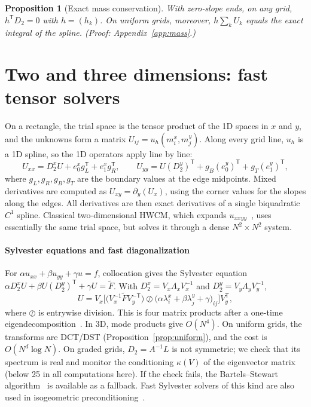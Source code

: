 \documentclass[preprint,12pt]{elsarticle}
\newtheorem{proposition}[theorem]{Proposition}
\theoremstyle{remark}
\newcommand{\proofin}[1]{\hfill{\small\emph{(Proof: Appendix~\ref{#1}.)}}}
\begin{document}
\begin{proposition}[Exact mass conservation]\label{prop:mass}
With zero-slope ends, on any grid, $h^{\mathsf T}D_2=0$ with $h=(h_k)$. On uniform grids,
moreover, $h\sum_kU_k$ equals the exact integral of the spline.
\proofin{app:mass}
\end{proposition}

\section{Two and three dimensions: fast tensor solvers}\label{sec:tensor}
On a rectangle, the trial space is the tensor product of the 1D spaces in $x$ and $y$, and the unknowns
form a matrix $U_{ij}=u_h(m^x_i,m^y_j)$. Along every grid line, $u_h$ is a 1D spline, so the 1D
operators apply line by line:
\begin{equation}\label{eq:tensorops}
U_{xx}=D_2^xU+e_0^x g_L^{\mathsf T}+e_1^x g_R^{\mathsf T},\qquad
U_{yy}=U(D_2^y)^{\mathsf T}+g_B(e_0^y)^{\mathsf T}+g_T(e_1^y)^{\mathsf T},
\end{equation}
where $g_L,g_R,g_B,g_T$ are the boundary values at the edge midpoints. Mixed derivatives are
computed as $U_{xy}=\partial_y(U_x)$, using the corner values for the slopes along the edges. All
derivatives are then exact derivatives of a single biquadratic $C^1$ spline. Classical
two-dimensional HWCM, which expands $u_{xxyy}$~\cite{lepik2011solving,oruc2019nonuniform}, uses
essentially the same trial space, but solves it through a dense $N^2\times N^2$ system.

\paragraph{Sylvester equations and fast diagonalization}
For $\alpha u_{xx}+\beta u_{yy}+\gamma u=f$, collocation gives the Sylvester equation
$\alpha D_2^xU+\beta U(D_2^y)^{\mathsf T}+\gamma U=\tilde F$. With $D_2^x=V_x\Lambda_xV_x^{-1}$ and
$D_2^y=V_y\Lambda_yV_y^{-1}$,
\begin{equation}\label{eq:fdm}
U=V_x\Big[\big(V_x^{-1}\tilde FV_y^{-\mathsf T}\big)\oslash\big(\alpha\lambda^x_i+\beta\lambda^y_j+\gamma\big)_{ij}\Big]V_y^{\mathsf T},
\end{equation}
where $\oslash$ is entrywise division. This is four matrix products after a one-time
eigendecomposition~\cite{lynch1964direct}. In 3D, mode products give $O(N^4)$. On uniform grids, the
transforms are DCT/DST (Proposition~\ref{prop:uniform}), and the cost is $O(N^d\log N)$. On graded
grids, $D_2=A^{-1}L$ is not symmetric; we check that its spectrum is real and monitor the
conditioning $\kappa(V)$ of the eigenvector matrix (below 25 in all computations here). If the check
fails, the Bartels--Stewart algorithm~\cite{bartels1972solution} is available as a fallback. Fast
Sylvester solvers of this kind are also used in isogeometric preconditioning~\cite{sangalli2016isogeometric}.
\end{document}
